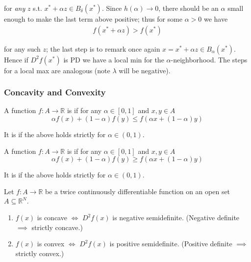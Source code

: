 \documentclass{article}
\begin{document}
\begin{remark}
  for \textit{any} $z$ s.t. $x^* + \alpha z \in B_{\delta}(x^*)$. Since $h(\alpha) \to 0$, there should be an $\alpha$ small enough to make the last term above positive; thus for some $\alpha > 0$ we have
  \begin{align*}
    f(x^* + \alpha z) > f(x^*)
  \end{align*}

  for any such $z$; the last step is to remark once again $x = x^* + \alpha z \in B_{\alpha}(x^*)$. Hence if $D^2f(x^*)$ is PD we have a local min for the $\alpha$-neighborhood. The steps for a local max are analogous (note $\lambda$ will be negative).
\end{remark}

\subsubsection{Concavity and Convexity}
\label{ssub:concavity_and_convexity}

\begin{definition}
  A function $f: A \to \mathbb{R}$ is  if for any $\alpha \in [0, 1]$ and $x, y \in A$
  \[
    \alpha f(x) + (1 - \alpha) f(y)
    \le
    f(\alpha x + (1 - \alpha) y)
  \]

  It is  if the above holds strictly for $\alpha \in (0, 1)$.
\end{definition}

\begin{definition}
  A function $f: A \to \mathbb{R}$ is  if for any $\alpha \in [0, 1]$ and $x, y \in A$
  \[
    \alpha f(x) + (1 - \alpha) f(y)
    \ge
    f(\alpha x + (1 - \alpha) y)
  \]

  It is  if the above holds strictly for $\alpha \in (0, 1)$.
\end{definition}

\begin{theorem}
  Let $f: A \to \mathbb{R}$ be a twice continuously differentiable function on an open set $A \subseteq \mathbb{R}^N$.
  \begin{enumerate}
    \item $f(x)$ is concave $\iff$ $D^2f(x)$ is negative semidefinite. (Negative definite $\implies$ strictly concave.)
    \item $f(x)$ is convex $\iff$ $D^2f(x)$ is positive semidefinite. (Positive definite $\implies$ strictly convex.)
  \end{enumerate}
\end{theorem}
\end{document}
